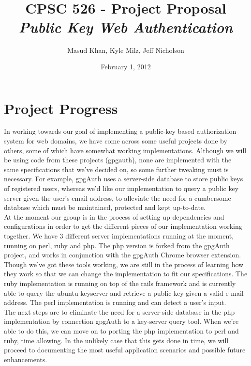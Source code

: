 \documentclass[11pt]{article}
\begin{document}
\title{\bf CPSC 526 - Project Proposal \\ \emph{Public Key Web Authentication}}
\author{Masud Khan, Kyle Milz, Jeff Nicholson}
\date{February 1, 2012}
\maketitle

\tableofcontents
\pagebreak

\section{Project Progress}
In working towards our goal of implementing a public-key based authorization system for web domains, we have come across some useful projects done by others, some of which have somewhat working implementations.  Although we will be using code from these projects (gpgauth\cite{gpgauth}), none are implemented with the same specifications that we've decided on, so some further tweaking must is necessary.  For example, gpgAuth uses a server-side database to store public keys of registered users, whereas we'd like our implementation to query a public key server given the user's email address, to alleviate the need for a cumbersome database which must be maintained, protected and kept up-to-date.\\
	At the moment our group is in the process of setting up dependencies and configurations in order to get the different pieces of our implementation working together.  We have 3 different server implementations running at the moment, running on perl, ruby and php.  The php version is forked from the gpgAuth project, and works in conjunction with the gpgAuth Chrome browser extension.  Though we've got these tools working, we are still in the process of learning how they work so that we can change the implementation to fit our specifications.  The ruby implementation is running on top of the rails framework and is currently able to query the ubuntu keyserver and retrieve a public key given a valid e-mail address.  The perl implementation is running and can detect a user's input.\\
	The next steps are to eliminate the need for a server-side database in the php implementation by connection gpgAuth to a key-server query tool.  When we're able to do this, we can move on to porting the php implementation to perl and ruby, time allowing.  In the unlikely case that this gets done in time, we will proceed to documenting the most useful application scenarios and possible future enhancements.
\end{document}
